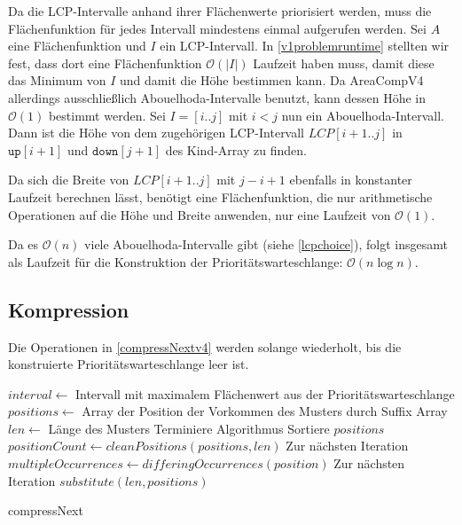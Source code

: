 Da die LCP-Intervalle anhand ihrer Flächenwerte priorisiert werden, muss die Flächenfunktion für jedes Intervall mindestens einmal aufgerufen werden. Sei $A$ eine Flächenfunktion und $I$ ein LCP-Intervall. In \autoref{v1problemruntime} stellten wir fest, dass dort eine Flächenfunktion $\mathcal{O}(|I|)$ Laufzeit haben muss, damit diese das Minimum von $I$ und damit die Höhe bestimmen kann.
Da AreaCompV4 allerdings ausschließlich Abouelhoda-Intervalle benutzt, kann dessen Höhe in $\mathcal{O}(1)$ bestimmt werden. Sei $I = [i..j]$ mit $i < j$ nun ein Abouelhoda-Intervall. Dann ist die Höhe von dem zugehörigen LCP-Intervall $LCP[i+1..j]$ in $\texttt{up}[i+1]$ und $\texttt{down}[j+1]$ des Kind-Array zu finden.

Da sich die Breite von $LCP[i+1..j]$ mit $j - i + 1$ ebenfalls in konstanter Laufzeit berechnen lässt, benötigt eine Flächenfunktion, die nur arithmetische Operationen auf die Höhe und Breite anwenden, nur eine Laufzeit von $\mathcal{O}(1)$.

Da es $\mathcal{O}(n)$ viele Abouelhoda-Intervalle gibt (siehe \autoref{lcpchoice}), folgt insgesamt als Laufzeit für die Konstruktion der Prioritätswarteschlange: $\mathcal{O}(n \log n)$.

\subsection{Kompression}

Die Operationen in \autoref{compressNextv4} werden solange wiederholt, bis die konstruierte Prioritätswarteschlange leer ist. 

\begin{algorithm}[t]
    $interval \leftarrow$ Intervall mit maximalem Flächenwert aus der Prioritätswarteschlange\;
    $positions \leftarrow$ Array der Position der Vorkommen des Musters durch Suffix Array\;
    $len \leftarrow$ Länge des Musters\;
     {
        Terminiere Algorithmus
    }
    Sortiere $positions$\;
    $positionCount \leftarrow cleanPositions(positions, len)$
     {
        Zur nächsten Iteration
    }
    $multipleOccurrences \leftarrow differingOccurrences(position)$
     {
        Zur nächsten Iteration
    }
    $substitute(len, positions)$\;

    \caption{compressNext}
    \label{compressNextv4}
\end{algorithm}

